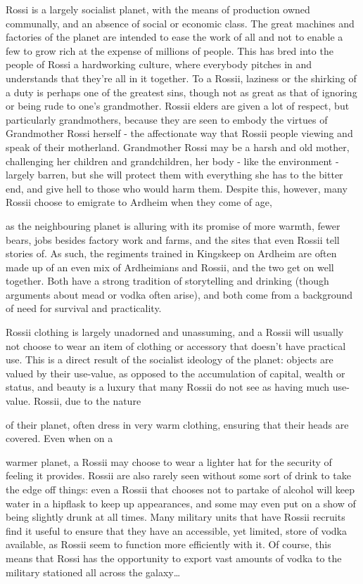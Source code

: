\documentclass{scrbook}
\begin{document}
Rossi is a largely socialist planet, with the means of production owned communally, and an absence of social or economic class. The great machines and factories of the planet are intended to ease the work of all and not to enable a few to grow rich at the expense of millions of people. This has bred into the people of Rossi a hardworking culture, where everybody pitches in and understands that they're all in it together. To a Rossii, laziness or the shirking of a duty is perhaps one of the greatest sins, though not as great as that of ignoring or being rude to one's grandmother. Rossii elders are given a lot of respect, but particularly grandmothers, because they are seen to embody the virtues of Grandmother Rossi herself - the affectionate way that Rossii people viewing and speak of their motherland. Grandmother Rossi may be a harsh and old mother, challenging her children and grandchildren, her body - like the environment - largely barren, but she will protect them with everything she has to the bitter end, and give hell to those who would harm them. Despite this, however, many Rossii choose to emigrate to Ardheim when they come of age,

as the neighbouring planet is alluring with its promise of more warmth, fewer bears, jobs besides factory work and farms, and the sites that even Rossii tell stories of. As such, the regiments trained in Kingskeep on Ardheim are often made up of an even mix of Ardheimians and Rossii, and the two get on well together. Both have a strong tradition of storytelling and drinking (though arguments about mead or vodka often arise), and both come from a background of need for survival and practicality.

Rossii clothing is largely unadorned and unassuming, and a Rossii will usually not choose to wear an item of clothing or accessory that doesn't have practical use. This is a direct result of the socialist ideology of the planet: objects are valued by their use-value, as opposed to the accumulation of capital, wealth or status, and beauty is a luxury that many Rossii do not see as having much use-value. Rossii, due to the nature

of their planet, often dress in very warm clothing, ensuring that their heads are covered. Even when on a

warmer planet, a Rossii may choose to wear a lighter hat for the security of feeling it provides. Rossii are also rarely seen without some sort of drink to take the edge off things: even a Rossii that chooses not to partake of alcohol will keep water in a hipflask to keep up appearances, and some may even put on a show of being slightly drunk at all times. Many military units that have Rossii recruits find it useful to ensure that they have an accessible, yet limited, store of vodka available, as Rossii seem to function more efficiently with it. Of course, this means that Rossi has the opportunity to export vast amounts of vodka to the military stationed all across the galaxy{\dots}
\end{document}

